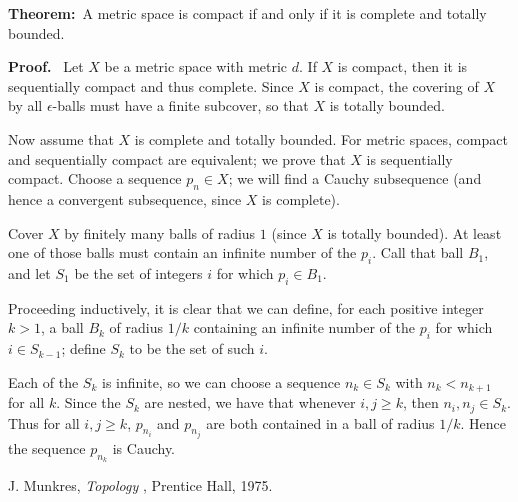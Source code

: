 \documentclass[12pt]{article}
\begin{document}
\textbf{Theorem:}\ A metric space is compact if and only if it is complete and totally bounded.

\textbf{Proof. }\ Let $X$ be a metric space with metric $d$. If $X$ is compact, then it is sequentially compact and thus complete. Since $X$ is compact, the covering of $X$ by all $\epsilon$-balls must have a finite subcover, so that $X$ is totally bounded.

Now assume that $X$ is complete and totally bounded. For metric spaces, compact and sequentially compact are equivalent; we prove that $X$ is sequentially compact. Choose a sequence $p_n\in X$; we will find a Cauchy subsequence (and hence a convergent subsequence, since $X$ is complete).

Cover $X$ by finitely many balls of radius $1$ (since $X$ is totally bounded). At least one of those balls must contain an infinite number of the $p_i$. Call that ball $B_1$, and let $S_1$ be the set of integers $i$ for which $p_i\in B_1$.

Proceeding inductively, it is clear that we can define, for each positive integer $k>1$, a ball $B_k$ of radius $1/k$ containing an infinite number of the $p_i$ for which $i\in S_{k-1}$; define $S_k$ to be the set of such $i$.

Each of the $S_k$ is infinite, so we can choose a sequence $n_k\in S_k$ with $n_k < n_{k+1}$ for all $k$. Since the $S_k$ are nested, we have that whenever $i,j\geq k$, then $n_i,n_j\in S_k$. Thus for all $i,j\geq k$, $p_{n_i}$ and $p_{n_j}$ are both contained in a ball of radius $1/k$. Hence the sequence $p_{n_k}$ is Cauchy.

\begin{thebibliography}{9}
 J. Munkres, \emph{Topology} , Prentice Hall, 1975.
\end{thebibliography}
\end{document}
